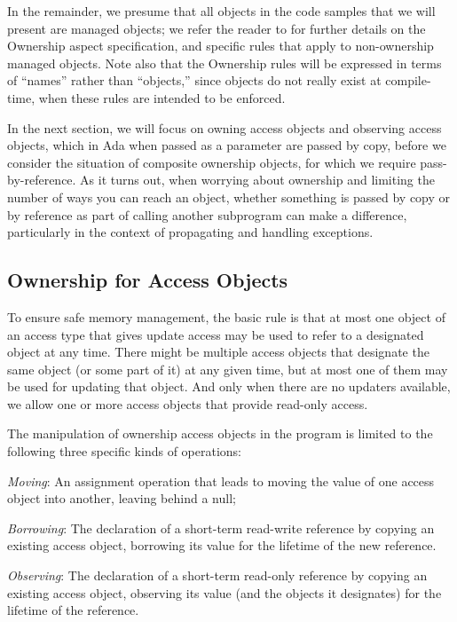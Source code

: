 \documentclass{llncs}
\begin{document}
\smallskip
In the remainder, we presume that all objects in the code samples that we will present are managed objects; we refer the reader to \cite{AI2018} for further details on
the Ownership aspect specification, and specific rules that apply to non-ownership managed objects. Note also that the Ownership rules will be expressed in terms
of ``names'' rather than ``objects,'' since objects do not really exist at compile-time, when these rules are intended to be enforced. 

\smallskip
In the next section, we will focus on owning access objects and observing access objects, which in Ada when passed as a parameter are passed by copy, before we
consider the situation of composite ownership objects, for which we require pass-by-reference.  As it turns out, when worrying about ownership and limiting the number of ways you can reach an object, whether something is passed by copy or by reference as part of calling another subprogram can make a difference, particularly in the context of propagating and handling exceptions.


\subsection{Ownership for Access Objects}
\label{subsec:ownershipAccess}

To ensure safe memory management, the basic rule is that at most one object of an access type that gives update access may be used to refer to a designated object at any time.  There might be multiple access objects that designate the same object (or some part of it) at any given time, but at most one of them may be used for updating that object.  And only when there are no updaters available, we allow one or more access objects that provide read-only access.

\smallskip
The manipulation of ownership access objects in the program is limited to the following three specific kinds of operations:

\begin{compactitem}
  \item \textit{Moving}: An assignment operation that leads to moving the value of one access object into another, leaving behind a null;
  \item \textit{Borrowing}: The declaration of a short-term read-write reference by copying an existing access object, borrowing its value for the lifetime of the new reference. 
  \item \textit{Observing}: The declaration of a short-term read-only reference by copying an existing access object, observing its value (and the objects it designates) for the lifetime of the reference. 
\end{compactitem}
\end{document}
